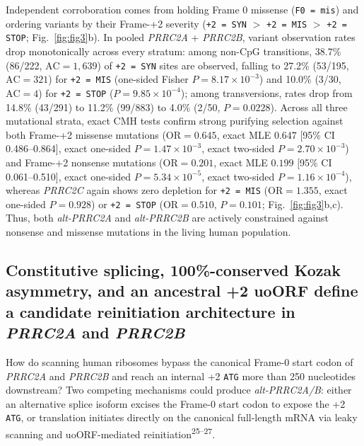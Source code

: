 \documentclass[10pt,letterpaper]{article}
\newcommand{\gene}[1]{\textit{#1}}
\newcommand{\refsup}[1]{\textsuperscript{#1}}
\begin{document}
Independent corroboration comes from holding Frame 0 missense (\texttt{F0 = mis}) and ordering variants by their Frame-+2 severity (\texttt{+2 = SYN} $>$ \texttt{+2 = MIS} $>$ \texttt{+2 = STOP}; Fig.~\ref{fig:fig3}b). In pooled \gene{PRRC2A} + \gene{PRRC2B}, variant observation rates drop monotonically across every stratum: among non-CpG transitions, 38.7\% (86/222, $\text{AC} = 1,639$) of \texttt{+2 = SYN} sites are observed, falling to 27.2\% (53/195, $\text{AC} = 321$) for \texttt{+2 = MIS} (one-sided Fisher $P = 8.17 \times 10^{-3}$) and 10.0\% (3/30, $\text{AC} = 4$) for \texttt{+2 = STOP} ($P = 9.85 \times 10^{-4}$); among transversions, rates drop from 14.8\% (43/291) to 11.2\% (99/883) to 4.0\% (2/50, $P = 0.0228$). Across all three mutational strata, exact CMH tests confirm strong purifying selection against both Frame-+2 missense mutations ($\text{OR} = 0.645$, exact MLE $0.647$ [95\% CI 0.486--0.864], exact one-sided $P = 1.47 \times 10^{-3}$, exact two-sided $P = 2.70 \times 10^{-3}$) and Frame-+2 nonsense mutations ($\text{OR} = 0.201$, exact MLE $0.199$ [95\% CI 0.061--0.510], exact one-sided $P = 5.34 \times 10^{-5}$, exact two-sided $P = 1.16 \times 10^{-4}$), whereas \gene{PRRC2C} again shows zero depletion for \texttt{+2 = MIS} ($\text{OR} = 1.355$, exact one-sided $P = 0.928$) or \texttt{+2 = STOP} ($\text{OR} = 0.510$, $P = 0.101$; Fig.~\ref{fig:fig3}b,c). Thus, both \gene{alt-PRRC2A} and \gene{alt-PRRC2B} are actively constrained against nonsense and missense mutations in the living human population.

\subsection{Constitutive splicing, 100\%-conserved Kozak asymmetry, and an ancestral +2 uoORF define a candidate reinitiation architecture in \gene{PRRC2A} and \gene{PRRC2B}}

How do scanning human ribosomes bypass the canonical Frame-0 start codon of \gene{PRRC2A} and \gene{PRRC2B} and reach an internal +2 \texttt{ATG} more than 250 nucleotides downstream? Two competing mechanisms could produce \gene{alt-PRRC2A/B}: either an alternative splice isoform excises the Frame-0 start codon to expose the +2 \texttt{ATG}, or translation initiates directly on the canonical full-length mRNA via leaky scanning and uoORF-mediated reinitiation\refsup{25--27}.
\end{document}
